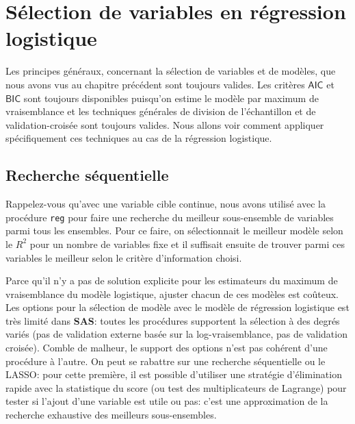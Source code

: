 \documentclass[
  11pt,
  letterpaper,
]{book}
\theoremstyle{definition}
\theoremstyle{definition}
\theoremstyle{definition}
\theoremstyle{definition}
\theoremstyle{remark}
\begin{document}
\hypertarget{suxe9lection-de-variables-en-ruxe9gression-logistique}{%
\section{Sélection de variables en régression logistique}\label{suxe9lection-de-variables-en-ruxe9gression-logistique}}

Les principes généraux, concernant la sélection de variables et de modèles, que nous avons vus au chapitre précédent sont toujours valides. Les critères \(\mathsf{AIC}\) et \(\mathsf{BIC}\) sont toujours disponibles puisqu'on estime le modèle par maximum de vraisemblance et les techniques générales de division de l'échantillon et de validation-croisée sont toujours valides. Nous allons voir comment appliquer spécifiquement ces techniques au cas de la régression logistique.

\hypertarget{recherche-suxe9quentielle}{%
\subsection{Recherche séquentielle}\label{recherche-suxe9quentielle}}

Rappelez-vous qu'avec une variable cible continue, nous avons utilisé avec la procédure \texttt{reg} pour faire une recherche du meilleur sous-ensemble de variables parmi tous les ensembles. Pour ce faire, on sélectionnait le meilleur modèle selon le \(R^2\) pour un nombre de variables fixe et il suffisait ensuite de trouver parmi ces variables le meilleur selon le critère d'information choisi.

Parce qu'il n'y a pas de solution explicite pour les estimateurs du maximum de vraisemblance du modèle logistique, ajuster chacun de ces modèles est coûteux. Les options pour la sélection de modèle avec le modèle de régression logistique est très limité dans \textbf{SAS}: toutes les procédures supportent la sélection à des degrés variés (pas de validation externe basée sur la log-vraisemblance, pas de validation croisée). Comble de malheur, le support des options n'est pas cohérent d'une procédure à l'autre. On peut se rabattre sur une recherche séquentielle ou le LASSO: pour cette première, il est possible d'utiliser une stratégie d'élimination rapide avec la statistique du score (ou test des multiplicateurs de Lagrange) pour tester si l'ajout d'une variable est utile ou pas: c'est une approximation de la recherche exhaustive des meilleurs sous-ensembles.
\end{document}

